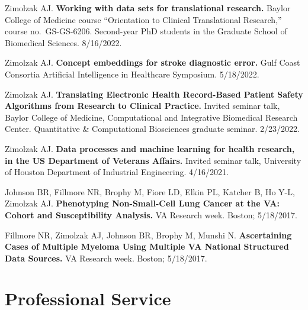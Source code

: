 \documentclass[10pt]{article}
\begin{document}
Zimolzak AJ. \textbf{Working with data sets for translational
  research.} Baylor College of Medicine course ``Orientation to
Clinical Translational Research,'' course no.\ GS-GS-6206. Second-year
PhD students in the Graduate School of Biomedical Sciences. 8/16/2022.

Zimolzak AJ. \textbf{Concept embeddings for stroke diagnostic error.}
Gulf Coast Consortia Artificial Intelligence in Healthcare Symposium.
5/18/2022.

Zimolzak AJ. \textbf{Translating Electronic Health Record-Based
  Patient Safety Algorithms from Research to Clinical Practice.}
Invited seminar talk, Baylor College of Medicine, Computational and
Integrative Biomedical Research Center. Quantitative \& Computational
Biosciences graduate seminar. 2/23/2022.

Zimolzak AJ. \textbf{Data processes and machine learning for health
  research, in the US Department of Veterans Affairs.} Invited seminar
talk, University of Houston Department of Industrial Engineering.
4/16/2021.

Johnson BR, Fillmore NR, Brophy M, Fiore LD, Elkin PL, Katcher B, Ho
Y-L, Zimolzak AJ. \textbf{Phenotyping Non-Small-Cell Lung Cancer at
  the VA: Cohort and Susceptibility Analysis.} VA Research week.
Boston; 5/18/2017.

Fillmore NR, Zimolzak AJ, Johnson BR, Brophy M, Munshi N.
\textbf{Ascertaining Cases of Multiple Myeloma Using Multiple VA
  National Structured Data Sources.} VA Research week. Boston;
5/18/2017.




\section*{Professional Service}
\end{document}
